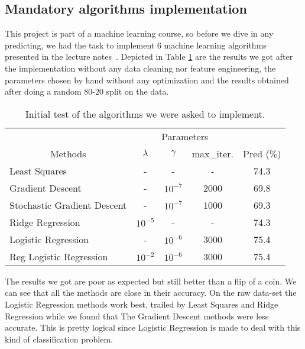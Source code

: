 \documentclass[10pt,conference,compsocconf]{IEEEtran}
\begin{document}
\subsection{Mandatory algorithms implementation}
This project is part of a machine learning course, so before we dive in any predicting, we had the task to implement 6 machine learning algorithms presented in the lecture notes~\cite{MLepfl}.
Depicted in Table \ref{tab:initial_test} are the results we got after the implementation without any data cleaning nor feature engineering, the parameters chosen by hand without any optimization and the results obtained after doing a random 80-20 split on the data.
\begin{table}[h!]
    \centering
    \begin{tabular}{|l|c|c|c|c|}
\hline
                              & \multicolumn{3}{c|}{Parameters}   &           \\
\multicolumn{1}{|c|}{Methods} & $\lambda$ & $\gamma$  & max\_iter. & Pred (\%) \\ \hline
Least Squares                 & -         & -         & -         & 74.3      \\ \hline
Gradient Descent              & -         & $10^{-7}$ & 2000      & 69.8      \\ \hline
Stochastic Gradient Descent   & -         & $10^{-7}$ & 1000      & 69.3      \\ \hline
Ridge Regression              & $10^{-5}$ & -         & -         & 74.3      \\ \hline
Logistic Regression           & -         & $10^{-6}$ & 3000      & 75.4     \\ \hline
Reg Logistic Regression       & $10^{-2}$         & $10^{-6}$ & 3000      & 75.4     \\ \hline
\end{tabular}
    \caption{Initial test of the algorithms we were asked to implement.}
    \label{tab:initial_test}
\end{table}

\vspace{-0.7cm}
The results we got are poor as expected but still better than a flip of a coin. We can see that all the methods are close in their accuracy. On the raw data-set the Logistic Regression methods work best, trailed by Least Squares and Ridge Regression while we found that The Gradient Descent methods were less accurate. This is pretty logical since Logistic Regression is made to deal with this kind of classification problem.
\end{document}

